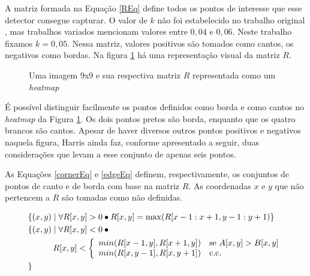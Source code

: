 \documentclass[12pt]{article}
\begin{document}
A  matriz formada  na  Equação  \ref{REq} define  todos  os pontos  de
interesse que esse detector consegue  capturar. O valor de $k$ não foi
estabelecido  no   trabalho  original  \cite{harris},   mas  trabalhos
variados \cite{detectors, statharris} mencionam valores entre $0,04$ e
$0,06$.   Neste trabalho fixamos  $k =  0,05$.  Nessa  matriz, valores
positivos são tomados como cantos, os negativos como bordas. Na figura
\ref{figR} há uma representação visual da matriz $R$.

\begin{figure}[h]
  \centering
  \quad
  \caption{Uma imagem 9x9 e sua respectiva matriz $R$ representada
    como um \textit{heatmap}\label{figR}}
\end{figure}

É possível distinguir facilmente os  pontos definidos como borda e como
cantos no \textit{heatmap} da Figura \ref{figR}. Os dois pontos pretos
são borda, enquanto que os  quatro brancos são cantos. Apesar de haver
diversos outros  pontos positivos  e negativos naquela  figura, Harris
ainda faz, conforme apresentado a seguir, duas considerações que levam
a esse conjunto de apenas seis pontos.

As Equações \ref{cornerEq} e \ref{edgeEq} definem, respectivamente, os
conjuntos de  pontos de canto  e de borda  com base na matriz  $R$. As
coordenadas $x$  e $y$ que  não pertencem a  $R$ são tomadas  como não
definidas.

\begin{align}
  &\{(x, y) \mid \forall R[x,y] > 0 \bullet R[x,y] = \max(R[x-1:x+1,y-1:y+1)\} \label{cornerEq} \\
  &\{
    (x, y) \mid \forall R[x,y] < 0 \bullet \mbox{} \nonumber \\
  & \quad\quad\quad R[x,y] < \left\{
      \begin{array}{l l}
        min(R[x-1,y], R[x+1,y]) & \mbox{se} \,\, A[x,y] > B[x,y]\\
        min(R[x,y-1], R[x,y+1]) & \mbox{c.c.}\\
      \end{array}
    \right. \label{edgeEq} \\
  &\} \nonumber
\end{align}
\end{document}
